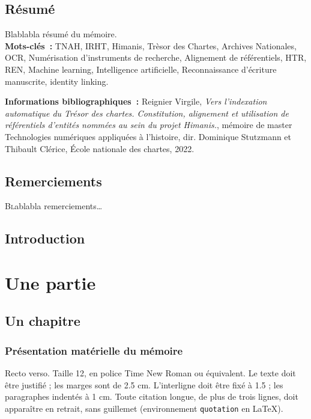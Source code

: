 \documentclass[a4paper,12pt,twoside]{book}
\begin{document}
	\chapter{Résumé}
	\medskip
	Blablabla résumé du mémoire.\\
	
	\textbf{Mots-clés~:} TNAH, IRHT, Himanis, Trèsor des Chartes, Archives Nationales, OCR, Numérisation d'instruments de recherche, Alignement de référentiels, HTR, REN, Machine learning, Intelligence artificielle, Reconnaissance d'écriture manuscrite, identity linking.
	
	\textbf{Informations bibliographiques~:} Reignier Virgile, \textit{Vers l’indexation automatique du Trésor des chartes. Constitution, alignement et utilisation de référentiels d’entités nommées au sein du projet Himanis.}, mémoire de master \og{}Technologies numériques appliquées à l'histoire\fg{}, dir. Dominique Stutzmann et Thibault Clérice, École nationale des chartes, 2022.
	
	\chapter{Remerciements}
	
	\lettrine{B}lablabla remerciements\dots
	
	
	\chapter{Introduction}
	
	\thispagestyle{empty}
	\cleardoublepage
	
	\mainmatter
	
	\part{Une partie}
	
	\chapter{Un chapitre}
	
	\section{Présentation matérielle du mémoire}
	
	Recto verso. Taille 12, en police Time New Roman ou équivalent. Le texte doit être justifié ; les marges sont de 2.5 cm. L'interligne doit être fixé à 1.5 ; les paragraphes indentés à 1 cm. Toute citation longue, de plus de trois lignes, doit apparaître en retrait, sans guillemet (environnement \texttt{quotation} en \LaTeX ).
	
\end{document}
